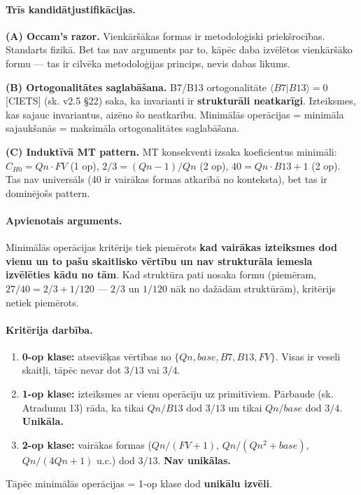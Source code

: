 \documentclass[12pt,a4paper]{article}
\begin{document}
\paragraph{Trīs kandidātjustifikācijas.}

\textbf{(A) Occam's razor.} Vienkāršākas formas ir metodoloģiski priekšrocības. Standarts fizikā. Bet tas nav arguments par to, kāpēc daba izvēlētos vienkāršāko formu — tas ir cilvēka metodoloģijas princips, nevis dabas likums.

\textbf{(B) Ortogonalitātes saglabāšana.} B7/B13 ortogonalitāte $\langle B7|B13\rangle = 0$ [CIETS] (sk. v2.5 §22) saka, ka invarianti ir \textbf{strukturāli neatkarīgi}. Izteiksmes, kas sajauc invariantus, aizēno šo neatkarību. Minimālās operācijas = minimāla sajaukšanās = maksimāla ortogonalitātes saglabāšana.

\textbf{(C) Induktīvā MT pattern.} MT konsekventi izsaka koeficientus minimāli: $C_{H0} = Qn \cdot FV$ (1 op), $2/3 = (Qn-1)/Qn$ (2 op), $40 = Qn \cdot B13 + 1$ (2 op). Tas nav universāls (40 ir vairākas formas atkarībā no konteksta), bet tas ir dominējošs pattern.

\paragraph{Apvienotais arguments.}
Minimālās operācijas kritērijs tiek piemērots \textbf{kad vairākas izteiksmes dod vienu un to pašu skaitlisko vērtību un nav strukturāla iemesla izvēlēties kādu no tām}. Kad struktūra pati nosaka formu (piemēram, $27/40 = 2/3 + 1/120$ — $2/3$ un $1/120$ nāk no dažādām struktūrām), kritērijs netiek piemērots.

\paragraph{Kritērija darbība.}
\begin{enumerate}
    \item \textbf{0-op klase:} atsevišķas vērtības no $\{Qn, base, B7, B13, FV\}$. Visas ir veseli skaitļi, tāpēc nevar dot $3/13$ vai $3/4$.
    \item \textbf{1-op klase:} izteiksmes ar vienu operāciju uz primitīviem. Pārbaude (sk. Atradumu 13) rāda, ka tikai $Qn/B13$ dod $3/13$ un tikai $Qn/base$ dod $3/4$. \textbf{Unikāla.}
    \item \textbf{2-op klase:} vairākas formas ($Qn/(FV+1)$, $Qn/(Qn^2+base)$, $Qn/(4Qn+1)$ u.c.) dod $3/13$. \textbf{Nav unikālas.}
\end{enumerate}
Tāpēc minimālās operācijas = 1-op klase dod \textbf{unikālu izvēli}.
\end{document}
